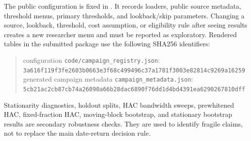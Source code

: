 \documentclass[12pt,a4paper]{article}
\begin{document}
The public configuration is fixed in .  It
records loaders, public source metadata, threshold menus, primary
thresholds, and lookback/skip parameters.  Changing a source, lookback,
threshold, cost assumption, or eligibility rule after seeing results
creates a new researcher menu and must be reported as exploratory.
Rendered tables in the submitted package use the following SHA256
identifiers:
\begin{quote}\scriptsize
\noindent configuration \texttt{code/campaign\_registry.json}:\\
\texttt{3a616f119f3fe2603b0663e3f68c499496c37a1781f3003e82814c9269a16259}\\
\noindent generated campaign metadata \texttt{campaign\_metadata.json}:\\
\texttt{5cb21ac2cb87cb74a26090a66b28dac6890f76dd1d4bd4391ea6290267810dff}
\end{quote}

Stationarity diagnostics, holdout splits, HAC bandwidth sweeps,
prewhitened HAC, fixed-fraction HAC, moving-block bootstrap, and
stationary bootstrap results are secondary robustness checks.  They are
used to identify fragile claims, not to replace the main date-return
decision rule.
\end{document}
